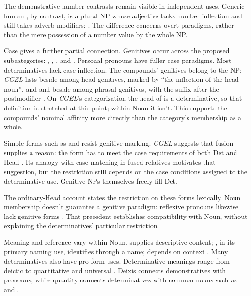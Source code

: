 \documentclass[12pt]{article}
\begin{document}
The demonstrative number contrasts remain visible in independent uses. Generic human , by contrast, is a plural NP whose adjective lacks number inflection and still takes adverb modifiers:  \citep[418]{huddleston2002}. The difference concerns overt paradigms, rather than the mere possession of a number value by the whole NP.

Case gives a further partial connection. Genitives occur across the proposed subcategories: , , , and . Personal pronouns have fuller case paradigms. Most determinatives lack case inflection. The compounds' genitives belong to the NP: \textit{CGEL} lists  beside  among head genitives, marked by \enquote{the inflection of the head noun}, and  and  beside  among phrasal genitives, with the suffix after the postmodifier \citep[479]{huddleston2002}. On \textit{CGEL}'s categorization the head of  is a determinative, so that definition is stretched at this point; within Noun it isn't. This supports the compounds' nominal affinity more directly than the category's membership as a whole.

Simple forms such as  and  resist genitive marking. \textit{CGEL} suggests that fusion supplies a reason: the form has to meet the case requirements of both Det and Head \citep[420]{huddleston2002}. Its analogy with case matching in fused relatives \citep[1073--1074]{huddleston2002} motivates that suggestion, but the restriction still depends on the case conditions assigned to the determinative use. Genitive NPs themselves freely fill Det.

The ordinary-Head account states the restriction on these forms lexically. Noun membership doesn't guarantee a genitive paradigm: reflexive pronouns likewise lack genitive forms \citep[426]{huddleston2002}. That precedent establishes compatibility with Noun, without explaining the determinatives' particular restriction.

Meaning and reference vary within Noun.  supplies descriptive content; , in its primary naming use, identifies through a name;  depends on context \citep[425--428, 516--521]{huddleston2002}. Many determinatives also have pro-form uses. Determinative meanings range from deictic  to quantitative  and universal  \citep[358--360, 370--405]{huddleston2002}. Deixis connects demonstratives with pronouns, while quantity connects determinatives with common nouns such as  and .
\end{document}
